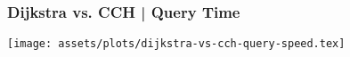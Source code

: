 \begin{frame}
    \frametitle{Dijkstra vs. CCH | Query Time}

    \centering
    \texttt{[image: assets/plots/dijkstra-vs-cch-query-speed.tex]}

\end{frame}